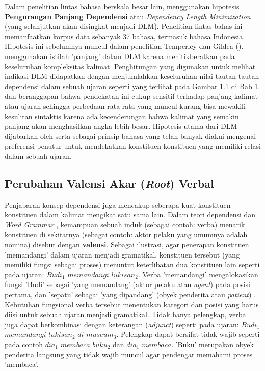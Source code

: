 Dalam penelitian lintas bahasa berskala besar lain, \cite{futrell2015large} menggunakan hipotesis \textbf{Pengurangan Panjang Dependensi} atau \textit{Dependency Length Minimization} (yang selanjutkan akan disingkat menjadi DLM). Penelitian lintas bahas ini memanfaatkan korpus data sebanyak 37 bahasa, termasuk bahasa Indonesia. Hipotesis ini sebelumnya muncul dalam penelitian Temperley dan Gildea (\citealp{temperley2007minimization, temperley2008dependency, gildea2010grammars}). \cite{gildea2010grammars} menggunakan istilah 'panjang' dalam DLM karena menitikberatkan pada keseluruhan kompleksitas kalimat. Penghitungan yang digunakan untuk melihat indikasi DLM didapatkan dengan menjumlahkan keseluruhan nilai tautan-tautan dependensi dalam sebuah ujaran seperti yang terlihat pada Gambar 1.1 di Bab 1. \cite{liu2017dependency} dan \cite{i2004euclidean} beranggapan bahwa pendekatan ini cukup sensitif terhadap panjang kalimat atau ujaran sehingga perbedaan rata-rata yang muncul kurang bisa mewakili kesulitan sintaktis karena ada kecenderungan bahwa kalimat yang semakin panjang akan menghasilkan angka lebih besar. Hipotesis utama dari DLM dijabarkan oleh \cite{gildea2010grammars} serta \cite{futrell2015large} sebagai prinsip bahasa yang telah banyak diakui mengenai preferensi penutur untuk mendekatkan konstituen-konstituen yang memiliki relasi dalam sebuah ujaran.

\subsection{Perubahan Valensi Akar (\textit{Root}) Verbal}
Penjabaran konsep dependensi juga mencakup seberapa kuat konstituen-konstituen dalam kalimat mengikat satu sama lain. Dalam teori dependensi \citep{tesniere1959elements} dan \textit{Word Grammar} \citep{hudson2007language}, kemampuan sebuah induk (sebagai contoh: verba) menarik konstituen di sekitarnya (sebagai contoh: aktor pelaku yang umumnya adalah nomina) disebut dengan \textbf{valensi}. Sebagai ilustrasi, agar penerapan konstituen 'memandangi' dalam ujaran menjadi gramatikal, konstituen tersebut (yang memiliki fungsi sebagai proses) menuntut keterlibatan dua konstituen lain seperti pada ujaran: $Budi_1$ $memandangi$ $lukisan_2$. Verba 'memandangi' mengalokasikan fungsi 'Budi' sebagai 'yang memandang' (aktor pelaku atau \textit{agent}) pada posisi pertama, dan 'sepatu' sebagai 'yang dipandang' (obyek penderita atau \textit{patient}) \citep{welke2002deutsche}. Kebutuhan fungsional verba tersebut menentukan kategori dan posisi yang harus diisi untuk sebuah ujaran menjadi gramatikal. Tidak hanya pelengkap, verba juga dapat berkombinasi dengan keterangan (\textit{adjunct}) seperti pada ujaran: $Budi_1$ $memandangi$ $lukisan_2$ $di$ $museum_3$. Pelengkap dapat bersifat tidak wajib seperti pada contoh $dia_1$ $membaca$ $buku_2$ dan $dia_1$ $membaca$. 'Buku' merupakan obyek penderita langsung yang tidak wajib muncul agar pendengar memahami proses 'membaca'. 

